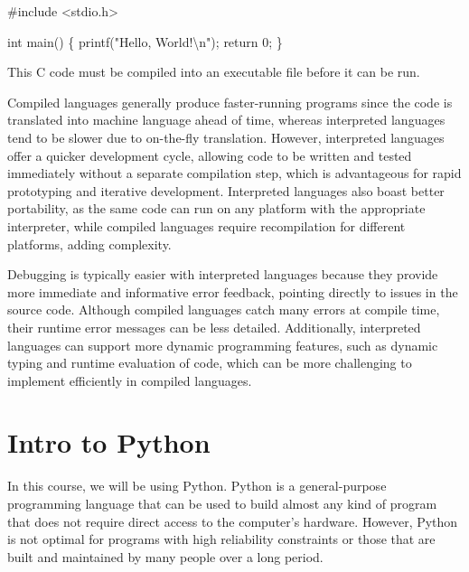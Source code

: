 \documentclass[
  letterpaper,
  DIV=11,
  numbers=noendperiod]{scrreprt}
\newenvironment{Shaded}{\begin{snugshade}}{\end{snugshade}}
\newcommand{\ControlFlowTok}[1]{\textcolor[rgb]{0.00,0.23,0.31}{#1}}
\newcommand{\DataTypeTok}[1]{\textcolor[rgb]{0.68,0.00,0.00}{#1}}
\newcommand{\DecValTok}[1]{\textcolor[rgb]{0.68,0.00,0.00}{#1}}
\newcommand{\ImportTok}[1]{\textcolor[rgb]{0.00,0.46,0.62}{#1}}
\newcommand{\NormalTok}[1]{\textcolor[rgb]{0.00,0.23,0.31}{#1}}
\newcommand{\OperatorTok}[1]{\textcolor[rgb]{0.37,0.37,0.37}{#1}}
\newcommand{\PreprocessorTok}[1]{\textcolor[rgb]{0.68,0.00,0.00}{#1}}
\newcommand{\SpecialCharTok}[1]{\textcolor[rgb]{0.37,0.37,0.37}{#1}}
\newcommand{\StringTok}[1]{\textcolor[rgb]{0.13,0.47,0.30}{#1}}
\begin{document}
\begin{Shaded}
\begin{Highlighting}[]
\PreprocessorTok{\#include }\ImportTok{\textless{}stdio.h\textgreater{}}

\DataTypeTok{int}\NormalTok{ main}\OperatorTok{()} \OperatorTok{\{}
\NormalTok{    printf}\OperatorTok{(}\StringTok{"Hello, World!}\SpecialCharTok{\textbackslash{}n}\StringTok{"}\OperatorTok{);}
    \ControlFlowTok{return} \DecValTok{0}\OperatorTok{;}
\OperatorTok{\}}
\end{Highlighting}
\end{Shaded}

This C code must be compiled into an executable file before it can be
run.

Compiled languages generally produce faster-running programs since the
code is translated into machine language ahead of time, whereas
interpreted languages tend to be slower due to on-the-fly translation.
However, interpreted languages offer a quicker development cycle,
allowing code to be written and tested immediately without a separate
compilation step, which is advantageous for rapid prototyping and
iterative development. Interpreted languages also boast better
portability, as the same code can run on any platform with the
appropriate interpreter, while compiled languages require recompilation
for different platforms, adding complexity.

Debugging is typically easier with interpreted languages because they
provide more immediate and informative error feedback, pointing directly
to issues in the source code. Although compiled languages catch many
errors at compile time, their runtime error messages can be less
detailed. Additionally, interpreted languages can support more dynamic
programming features, such as dynamic typing and runtime evaluation of
code, which can be more challenging to implement efficiently in compiled
languages.

\hypertarget{intro-to-python}{%
\section{Intro to Python}\label{intro-to-python}}

In this course, we will be using Python. Python is a general-purpose
programming language that can be used to build almost any kind of
program that does not require direct access to the computer's hardware.
However, Python is not optimal for programs with high reliability
constraints or those that are built and maintained by many people over a
long period.
\end{document}
